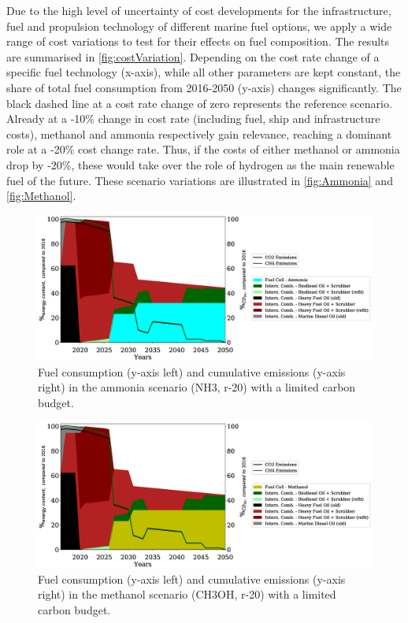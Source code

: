 \documentclass[article]{elsarticle}
\begin{document}
Due to the high level of uncertainty of cost developments for the infrastructure, fuel and propulsion technology of different marine fuel options, we apply a wide range of cost variations to test for their effects on fuel composition. The results are summarised in \autoref{fig:costVariation}. Depending on the cost rate change of a specific fuel technology (x-axis), while all other parameters are kept constant, the share of total fuel consumption from 2016-2050 (y-axis) changes significantly. The black dashed line at a cost rate change of zero represents the reference scenario. Already at a -10\% change in cost rate (including fuel, ship and infrastructure costs), methanol and ammonia respectively gain relevance, reaching a dominant role at a -20\% cost change rate. Thus, if the costs of either methanol or ammonia drop by -20\%, these would take over the role of hydrogen as the main renewable fuel of the future. These scenario variations are illustrated in \autoref{fig:Ammonia} and \autoref{fig:Methanol}.

\begin{figure}
    \centering
    \includegraphics[width=\textwidth]{figures/NH3_fuels_emissions.eps}
    \caption{Fuel consumption (y-axis left) and cumulative emissions (y-axis right) in the ammonia scenario (NH3, r-20) with a limited carbon budget.}
    \label{fig:Ammonia}
\end{figure}

\begin{figure}
    \centering
    \includegraphics[width=\textwidth]{figures/CH3OH_fuels_emissions.eps}
    \caption{Fuel consumption (y-axis left) and cumulative emissions (y-axis right) in the methanol scenario (CH3OH, r-20) with a limited carbon budget.}
    \label{fig:Methanol}
\end{figure}
\end{document}
